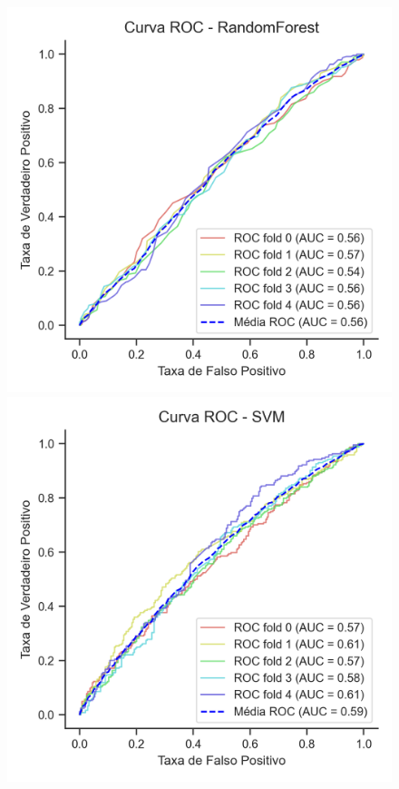 \begin{figure}
	\bigskip %
	
	\begin{minipage}[t]{0.28\textwidth}
		\centering
		\includegraphics[width=\textwidth]{USPSC-img/Curva ROC - RandomForest.png}
	\end{minipage}
	\hfill
	\begin{minipage}[t]{0.28\textwidth}
		\centering
		\includegraphics[width=\textwidth]{USPSC-img/Curva ROC - SVM.png}

\end{minipage}
\end{figure}
